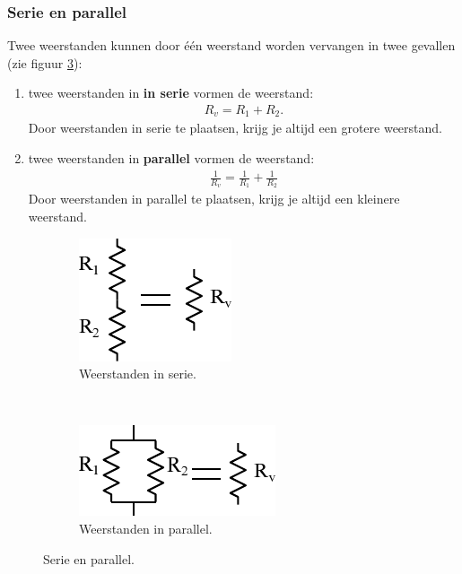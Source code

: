 \documentclass{article}
\begin{document}
		\subsubsection{Serie en parallel}
			\label{sssec:serie_en_parallel}
			Twee weerstanden kunnen door \'e\'en  weerstand worden vervangen in twee gevallen (zie figuur \ref{fig:serie_en_parallel}):

			\begin{enumerate}
				\item twee weerstanden in \textbf{in serie} vormen de weerstand:
				\begin{align}
					R_{v} = R_1 + R_2.
				\end{align}
				Door weerstanden in serie te plaatsen, krijg je altijd een grotere weerstand.

				\item twee weerstanden in \textbf{parallel} vormen de weerstand:
				\begin{align}
					\frac{1}{R_{v}}= \frac{1}{R_{1}} + \frac{1}{R_{2}} 
				\end{align}
				Door weerstanden in parallel te plaatsen, krijg je altijd een kleinere weerstand.
			\end{enumerate}

			\begin{figure}[hbtp]
				\centering
				\begin{subfigure}[b]{0.3\linewidth}
					\centering
					\includegraphics{serie}
					\caption{Weerstanden in serie.}
					\label{subfig:serie}
				\end{subfigure}
				~
				\begin{subfigure}[b]{0.3\linewidth}
					\centering
					\includegraphics{parallel}
					\caption{Weerstanden in parallel.}
					\label{subfig:parallel}
				\end{subfigure}
				\caption{Serie en parallel.}
				\label{fig:serie_en_parallel}
			\end{figure}
\end{document}
